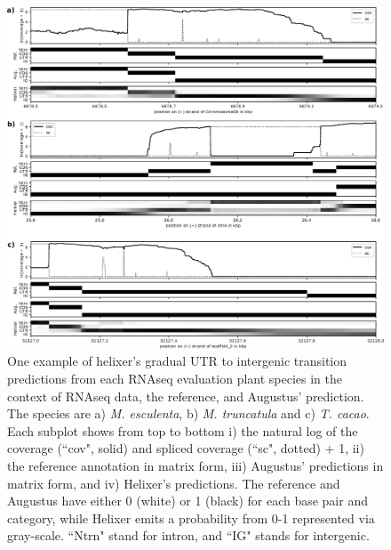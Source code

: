 \documentclass{article}
\renewcommand{\thefigure}{S\arabic{figure}}
\begin{document}
\begin{figure}[!h]
\label{supfig:UTRs_plants}
\centerline{\includegraphics[width=\textwidth]{images/cov_examples/cov_example_UTRs_plants}}
\caption{
One example of helixer's gradual UTR to intergenic transition predictions 
from each RNAseq evaluation plant species in the context of RNAseq data, the reference,
and Augustus' prediction. The species are
a) {\it M. esculenta}, b) {\it M. truncatula} and c) {\it T. cacao}. Each subplot shows from top to
bottom i) the natural log of the coverage (``cov", solid) and spliced coverage
(``sc", dotted) + 1, ii) the reference annotation in matrix form, iii)
Augustus' predictions in matrix form, and iv) Helixer's predictions. The reference
and Augustus have either 0 (white) or 1 (black) for each base pair and category, while
Helixer emits a probability from 0-1 represented via gray-scale. ``Ntrn" stand
for intron, and ``IG" stands for intergenic.
}
\end{figure}
\end{document}
